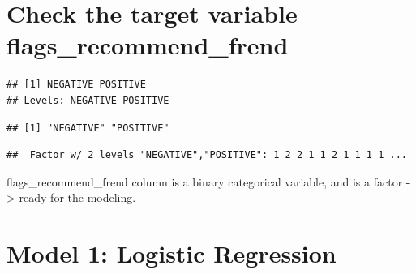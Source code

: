 \documentclass[
]{article}
\newenvironment{Shaded}{\begin{snugshade}}{\end{snugshade}}
\newcommand{\AttributeTok}[1]{\textcolor[rgb]{0.13,0.29,0.53}{#1}}
\newcommand{\CommentTok}[1]{\textcolor[rgb]{0.56,0.35,0.01}{\textit{#1}}}
\newcommand{\FunctionTok}[1]{\textcolor[rgb]{0.13,0.29,0.53}{\textbf{#1}}}
\newcommand{\NormalTok}[1]{#1}
\newcommand{\SpecialCharTok}[1]{\textcolor[rgb]{0.81,0.36,0.00}{\textbf{#1}}}
\newcommand{\StringTok}[1]{\textcolor[rgb]{0.31,0.60,0.02}{#1}}
\begin{document}
\section{Check the target variable
flags\_recommend\_frend}\label{check-the-target-variable-flags_recommend_frend}

\begin{Shaded}
\end{Shaded}

\begin{verbatim}
## [1] NEGATIVE POSITIVE
## Levels: NEGATIVE POSITIVE
\end{verbatim}

\begin{Shaded}
\end{Shaded}

\begin{verbatim}
## [1] "NEGATIVE" "POSITIVE"
\end{verbatim}

\begin{Shaded}
\end{Shaded}

\begin{verbatim}
##  Factor w/ 2 levels "NEGATIVE","POSITIVE": 1 2 2 1 1 2 1 1 1 1 ...
\end{verbatim}

flags\_recommend\_frend column is a binary categorical variable, and is
a factor -\textgreater{} ready for the modeling.

\section{Model 1: Logistic
Regression}\label{model-1-logistic-regression}

\begin{Shaded}
\end{Shaded}
\end{document}
